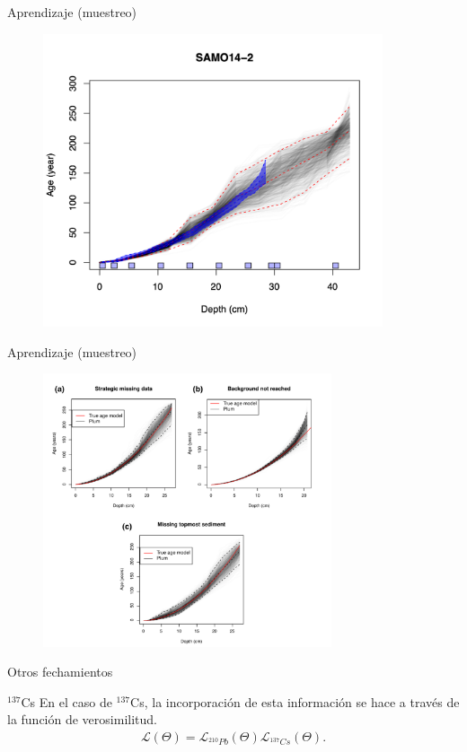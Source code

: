 \documentclass{beamer}
\begin{document}
\begin{frame}{Aprendizaje (muestreo)}
 	\begin{figure}
		\begin{centering}
			\includegraphics[width=10cm]{./Figures/SAMO14_2.png}
			\caption{}
			\label{}
		\end{centering}
	\end{figure}
\end{frame} 

\begin{frame}{Aprendizaje (muestreo)}
 	\begin{figure}
		\begin{centering}
			\includegraphics[width=8.5cm]{./Figures/Simulation_paper.png}
			\caption{}
			\label{}
		\end{centering}
	\end{figure}
\end{frame} 



\begin{frame}{Otros fechamientos}
	\begin{block}{$^{137}$Cs}
		En el caso de $^{137}$Cs, la incorporación de esta información se hace a través de la función de verosimilitud.
		\begin{eqnarray}
			\mathcal{L}\left(\Theta\right) = \mathcal{L}_{^{210}Pb}\left(\Theta\right) \mathcal{L}_{^{137}Cs}\left(\Theta\right).
		\end{eqnarray}
	\end{block} 
\end{frame}
\end{document}
